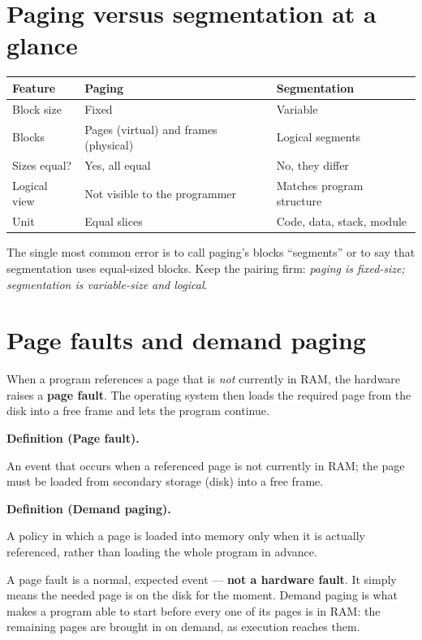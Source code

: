 \documentclass[11pt]{article}
\newenvironment{definitionbox}[1]{%
  \par\noindent\textbf{Definition (#1).}\ \itshape
}{\par\vspace{0.3em}}
\begin{document}
\section{Paging versus segmentation at a glance}
\begin{center}
\begin{tabular}{p{}p{}p{}}
\toprule
\textbf{Feature} & \textbf{Paging} & \textbf{Segmentation}\\
\midrule
Block size & Fixed & Variable\\
Blocks & Pages (virtual) and frames (physical) & Logical segments\\
Sizes equal? & Yes, all equal & No, they differ\\
Logical view & Not visible to the programmer & Matches program structure\\
Unit & Equal slices & Code, data, stack, module\\
\bottomrule
\end{tabular}
\end{center}

The single most common error is to call paging's blocks ``segments'' or to say
that segmentation uses equal-sized blocks. Keep the pairing firm:
\textit{paging is fixed-size; segmentation is variable-size and logical}.

\section{Page faults and demand paging}
When a program references a page that is \emph{not} currently in RAM, the
hardware raises a \textbf{page fault}. The operating system then loads the
required page from the disk into a free frame and lets the program continue.

\begin{definitionbox}{Page fault}
An event that occurs when a referenced page is not currently in RAM; the page
must be loaded from secondary storage (disk) into a free frame.
\end{definitionbox}

\begin{definitionbox}{Demand paging}
A policy in which a page is loaded into memory only when it is actually
referenced, rather than loading the whole program in advance.
\end{definitionbox}

A page fault is a normal, expected event --- \textbf{not a hardware fault}. It
simply means the needed page is on the disk for the moment. Demand paging is
what makes a program able to start before every one of its pages is in RAM: the
remaining pages are brought in on demand, as execution reaches them.
\end{document}

